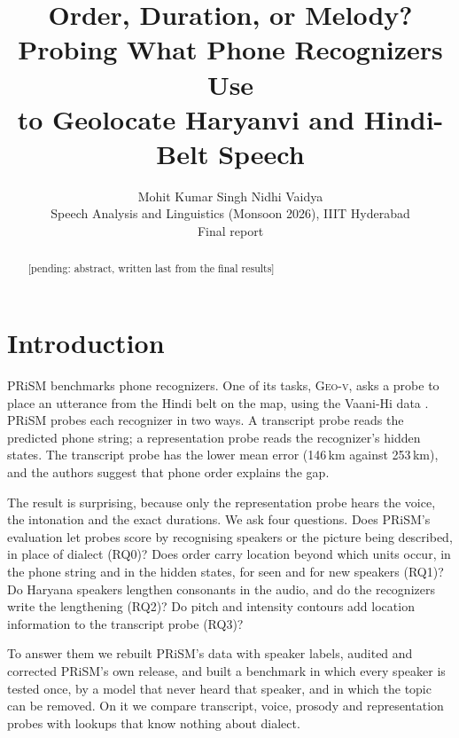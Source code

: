 \documentclass[11pt]{article}
\title{Order, Duration, or Melody? Probing What Phone Recognizers Use\\to Geolocate Haryanvi and Hindi-Belt Speech}
\author{Mohit Kumar Singh \qquad\qquad Nidhi Vaidya \\
  Speech Analysis and Linguistics (Monsoon 2026), IIIT Hyderabad \\
  Final report}
\newcommand{\geov}{\textsc{Geo-v}}
\newcommand{\pending}[1]{{\color{red}[pending: #1]}}
\begin{document}
\maketitle

\begin{abstract}
\pending{abstract, written last from the final results}
\end{abstract}

\section{Introduction}
PRiSM \citep{bharadwaj2026prism} benchmarks phone recognizers. One of its tasks, \geov{}, asks a probe to place
an utterance from the Hindi belt on the map, using the Vaani-Hi data \citep{ghosh2025vaani}. PRiSM probes each
recognizer in two ways. A transcript probe reads the predicted phone string; a representation probe reads the
recognizer's hidden states. The transcript probe has the lower mean error (146\,km against 253\,km), and the
authors suggest that phone order explains the gap.

The result is surprising, because only the representation probe hears the voice, the intonation and the exact
durations. We ask four questions. Does PRiSM's evaluation let probes score by recognising speakers or the picture
being described, in place of dialect (RQ0)? Does order carry location beyond which units occur, in the phone string
and in the hidden states, for seen and for new speakers (RQ1)? Do Haryana speakers lengthen consonants in the
audio, and do the recognizers write the lengthening (RQ2)? Do pitch and intensity contours add location
information to the transcript probe (RQ3)?

To answer them we rebuilt PRiSM's data with speaker labels, audited and corrected PRiSM's own release, and built a
benchmark in which every speaker is tested once, by a model that never heard that speaker, and in which the topic
can be removed. On it we compare transcript, voice, prosody and representation probes with lookups that know
nothing about dialect.
\end{document}
